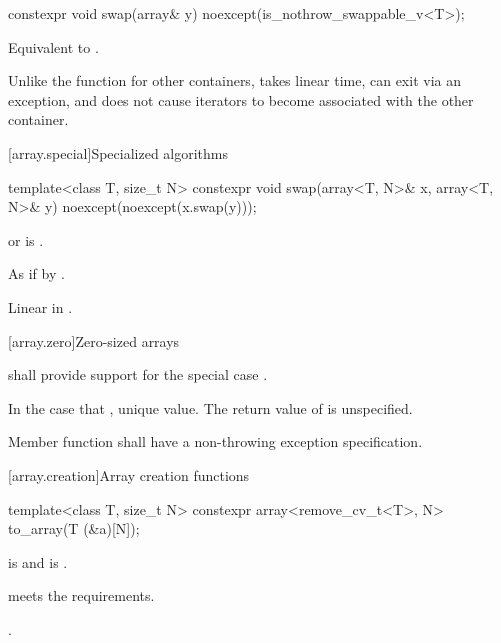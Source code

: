 %
\begin{itemdecl}
constexpr void swap(array& y) noexcept(is_nothrow_swappable_v<T>);
\end{itemdecl}

\begin{itemdescr}
\pnum
\effects
Equivalent to .

\pnum
\begin{note}
Unlike the  function for other containers, 
takes linear time, can exit via an exception, and does not cause iterators to
become associated with the other container.
\end{note}
\end{itemdescr}

[array.special]{Specialized algorithms}

%
\begin{itemdecl}
template<class T, size_t N>
  constexpr void swap(array<T, N>& x, array<T, N>& y) noexcept(noexcept(x.swap(y)));
\end{itemdecl}

\begin{itemdescr}
\pnum
\constraints
{} or  is .

\pnum
\effects
As if by .

\pnum
\complexity
Linear in .
\end{itemdescr}

[array.zero]{Zero-sized arrays}

%
\pnum
{} shall provide support for the special case .

\pnum
In the case that ,  unique value.
The return value of  is unspecified.

\pnum
Member function  shall have a
non-throwing exception specification.

[array.creation]{Array creation functions}
%

%
\begin{itemdecl}
template<class T, size_t N>
  constexpr array<remove_cv_t<T>, N> to_array(T (&a)[N]);
\end{itemdecl}

\begin{itemdescr}
\pnum
\mandates
{} is  and
 is .

\pnum
\expects
{} meets the  requirements.

\pnum
\returns
{}.
\end{itemdescr}

